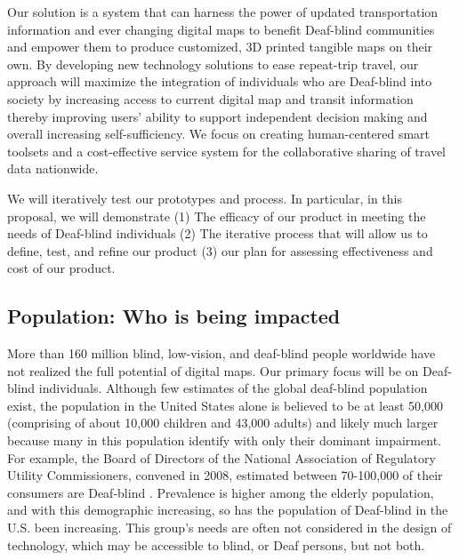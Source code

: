 Our solution is a system that can harness the power of updated transportation information and ever changing digital maps to benefit Deaf-blind communities and empower them to produce customized, 3D printed tangible maps on their own. 
By developing new technology solutions to ease repeat-trip travel, our approach will maximize the integration of individuals who are Deaf-blind into society by increasing access to current digital map and transit information thereby improving users' ability to support independent decision making and overall increasing self-sufficiency.
We focus on creating human-centered smart toolsets and a cost-effective service system for the collaborative sharing of travel data nationwide. 

We will iteratively test our prototypes and process. In particular, in this proposal, we will demonstrate (1) The efficacy of our product in meeting the needs of Deaf-blind individuals (2)  The iterative process that will allow us to define, test, and refine our product (3) our plan for assessing effectiveness and cost of our product. 



\subsection{Population: Who is being impacted}

More than 160 million blind, low-vision, and deaf-blind people worldwide have not realized the full potential of digital maps. 
Our primary focus will be on Deaf-blind individuals. Although few estimates of the global deaf-blind population exist, the population in the United States alone is believed to be at least 50,000 
\ac{(comprising of about 10,000 children and 43,000 adults)} \cite{NCDB} and likely much larger because many in this
population identify with only their dominant impairment. For example, the Board of Directors of the National Association of Regulatory Utility Commissioners, convened in 2008, estimated between 70-100,000 of their consumers are Deaf-blind \cite{NARUC}.
Prevalence is higher among the elderly population, and with this demographic increasing, so has the population of Deaf-blind in the U.S. been increasing. This group's needs are often not considered in the design of technology, which may be accessible to blind, or Deaf persons, but not both. 

